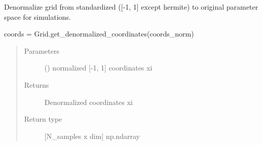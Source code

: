 \documentclass[letterpaper,10pt,english,openany,oneside]{sphinxmanual}
\begin{document}
\begin{fulllineitems}
\begin{fulllineitems}
\end{fulllineitems}


\begin{fulllineitems}
\label{\detokenize{pygpc:pygpc.Grid.Grid.coords}}
\end{fulllineitems}


\begin{fulllineitems}
\label{\detokenize{pygpc:pygpc.Grid.Grid.coords_norm}}
\end{fulllineitems}


\begin{fulllineitems}
\label{\detokenize{pygpc:pygpc.Grid.Grid.get_denormalized_coordinates}}
Denormalize grid from standardized ({[}-1, 1{]} except hermite) to original parameter space for simulations.

coords = Grid.get\_denormalized\_coordinates(coords\_norm)
\begin{quote}\begin{description}
\item[{Parameters}] \leavevmode
{} (\sphinxstyleliteralemphasis{\sphinxupquote{{[}}}\sphinxstyleliteralemphasis{\sphinxupquote{{]} }}) \textendash{} normalized {[}-1, 1{]} coordinates xi

\item[{Returns}] \leavevmode
{} \textendash{} Denormalized coordinates xi

\item[{Return type}] \leavevmode
{[}N\_samples x dim{]} np.ndarray

\end{description}\end{quote}


\end{fulllineitems}
\end{fulllineitems}
\end{document}
